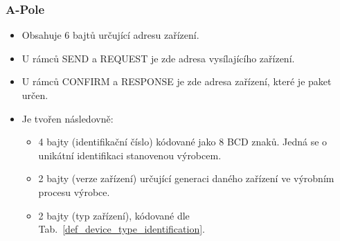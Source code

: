 \subsubsection{A-Pole}
\begin{itemize}
	\item Obsahuje 6 bajtů určující adresu zařízení.
	\item U rámců SEND a REQUEST je zde adresa vysílajícího zařízení.
	\item U rámců CONFIRM a RESPONSE je zde adresa zařízení, které je paket určen.
	\item Je tvořen následovně:
		\begin{itemize}
			\item 4 bajty (identifikační číslo) kódované jako 8 BCD znaků. Jedná se o unikátní identifikaci stanovenou výrobcem.
			\item 2 bajty (verze zařízení) určující generaci daného zařízení ve výrobním procesu výrobce.
			\item 2 bajty (typ zařízení), kódované dle Tab.~\ref{def_device_type_identification}.
		\end{itemize}
\end{itemize}

